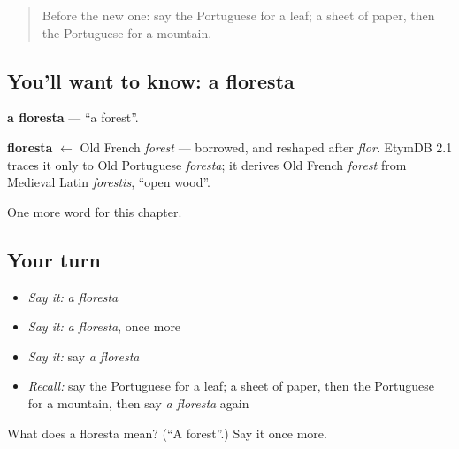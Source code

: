 \begin{quote}
Before the new one: say the Portuguese for a leaf; a sheet of paper, then the Portuguese for a mountain.
\end{quote}

\subsection*{You'll want to know: a floresta}
\textbf{a floresta} — \textquotedblleft{}a forest\textquotedblright{}.

\begin{cousinweb}
\textbf{floresta} $\leftarrow$ Old French \emph{forest} — borrowed, and reshaped after \emph{flor}. EtymDB 2.1 traces it only to Old Portuguese \emph{foresta}; it derives Old French \emph{forest} from Medieval Latin \emph{forestis}, \textquotedblleft{}open wood\textquotedblright{}.
\end{cousinweb}

\begin{grammarlens}[title={What you've built}]
One more word for this chapter.
\end{grammarlens}

\subsection*{Your turn}
\begin{itemize}
\raggedright
  \item \emph{Say it:} \emph{a floresta}
  \item \emph{Say it:} \emph{a floresta}, once more
  \item \emph{Say it:} say \emph{a floresta}
  \item \emph{Recall:} say the Portuguese for a leaf; a sheet of paper, then the Portuguese for a mountain, then say \emph{a floresta} again
\end{itemize}

\begin{tcolorbox}[breakable,colback=teal!4,colframe=teal!35!black,title={Before you move on}]
What does a floresta mean? (\textquotedblleft{}A forest\textquotedblright{}.) Say it once more.
\end{tcolorbox}
